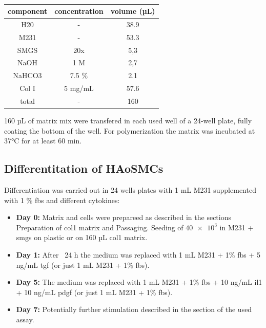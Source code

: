     \begin{table}[h]
    \capstart
	\centering
	\begin{minipage}{\captionwidth}
	   	\caption[Col I matrix]{}
	   	\label{tab:qPCR_samples}
	\end{minipage}
    \begin{tabular}{|c|c|c|}
        \hline
        component & concentration & volume (µL) \\ \hline
        H20       & -             & 38.9        \\
        M231      & -             & 53.3        \\
        SMGS      & 20x           & 5,3         \\
        NaOH      & 1 M           & 2,7         \\
        NaHCO3    & 7.5 \%        & 2.1         \\
        Col I     & 5 mg/mL       & 57.6        \\ \hline
        total     & -             & 160         \\ \hline
    \end{tabular}
    \end{table}

    160 µL of matrix mix were transfered in each used well of a 24-well plate, fully coating the bottom of the well. For polymerization the matrix was incubated at 37°C for at least 60 min.

    \subsection{Differentitation of HAoSMCs}
    Differentiation was carried out in 24 wells plates with 1 mL M231 supplemented with 1 \% \ac{fbs} and different cytokines:
    \begin{itemize}
        \item \textbf{Day 0:} Matrix and cells were prepareed as described in the sections Preparation of \ac{col1} matrix and Passaging. Seeding of $\num{40e3}$ in M231 + \ac{smgs} on plastic or on 160 µL \ac{col1} matrix.
        \item \textbf{Day 1:} After ~24 h the medium was replaced with 1 mL M231 + 1\% \ac{fbs} + 5 ng/mL \ac{tgf} (or just 1 mL M231 + 1\% \ac{fbs}).
        \item \textbf{Day 5:} The medium was replaced with 1 mL M231 + 1\% \ac{fbs} + 10 ng/mL \ac{il1} + 10 ng/mL \ac{pdgf} (or just 1 mL M231 + 1\% \ac{fbs}).
        \item \textbf{Day 7:} Potentially further stimulation described in the section of the used assay.
    \end{itemize}

